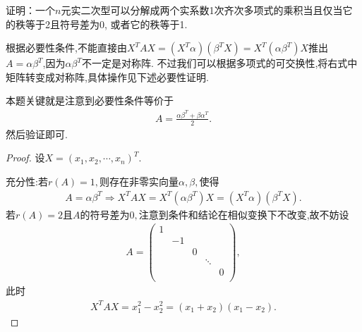 \documentclass[../../main.tex]{subfiles}%
\begin{document}
\begin{example}
证明：一个$n$元实二次型可以分解成两个实系数1次齐次多项式的乘积当且仅当它的秩等于2且符号差为0, 或者它的秩等于1.
\end{example}
\begin{note}
根据必要性条件,不能直接由$X^TAX=( X^T\alpha ) ( \beta ^TX ) =X^T( \alpha \beta ^T ) X$推出$A=\alpha \beta ^T$,因为$\alpha \beta ^T$不一定是对称阵.
不过我们可以根据多项式的可交换性,将右式中矩阵转变成对称阵,具体操作见下述必要性证明.

本题关键就是注意到必要性条件等价于
\begin{align*}
A=\frac{\alpha \beta ^T+\beta \alpha ^T}{2}.
\end{align*}
然后验证即可.
\end{note}
\begin{proof}

设$X=( x_1,x_2,\cdots ,x_n ) ^T$.

{\heiti 充分性:}若$r( A ) =1,$则存在非零实向量$\alpha ,\beta ,$使得
\begin{align*}
A=\alpha \beta ^T\Longrightarrow X^TAX=X^T( \alpha \beta ^T ) X=( X^T\alpha ) ( \beta ^TX ).
\end{align*}
若$r( A ) =2$且$A$的符号差为$0,$注意到条件和结论在相似变换下不改变,故不妨设
\begin{align*}
A=\begin{pmatrix}
1&		&		&		&		\\
&		-1&		&		&		\\
&		&		0&		&		\\
&		&		&		\ddots&		\\
&		&		&		&		0\\
\end{pmatrix},
\end{align*}
此时
\begin{align*}
X^TAX=x_{1}^{2}-x_{2}^{2}=( x_1+x_2 ) ( x_1-x_2 ).
\end{align*}


\end{proof}
\end{document}
